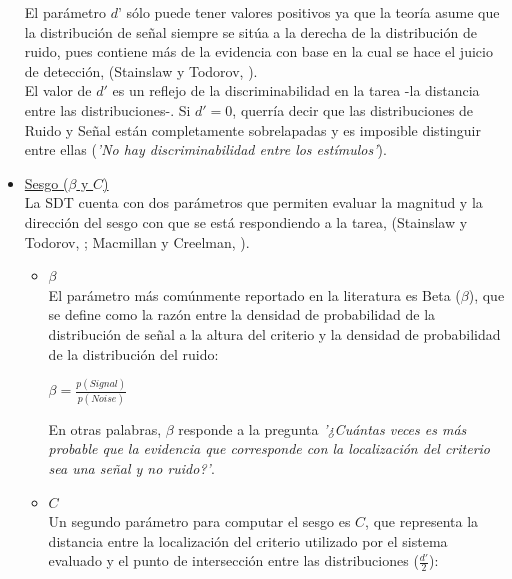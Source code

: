 \begin{itemize}
\begin{enumerate}
\end{enumerate}

El parámetro $d’$ sólo puede tener valores positivos ya que la teoría asume que la distribución de señal siempre se sitúa a la derecha de la distribución de ruido, pues contiene más de la evidencia con base en la cual se hace el juicio de detección, (Stainslaw y Todorov, \citeyear{Stainslaw1999}).\\

El valor de $d'$ es un reflejo de la discriminabilidad en la tarea -la distancia entre las distribuciones-. Si $d' = 0$, querría decir que las distribuciones de Ruido y Señal están completamente sobrelapadas y es imposible distinguir entre ellas (\textit{'No hay discriminabilidad entre los estímulos'}). \\

\item \underline{Sesgo ($\beta$ y $C$)}\\

La SDT cuenta con dos parámetros que permiten evaluar la magnitud y la dirección del sesgo con que se está respondiendo a la tarea, (Stainslaw y Todorov, \citeyear{Stainslaw1999}; Macmillan y Creelman, \citeyear{Macmillan1996}).\\

\begin{itemize}
\item \underline{$\beta$}\\

El parámetro más comúnmente reportado en la literatura es Beta ($\beta$), que se define como la razón entre la densidad de probabilidad de la distribución de señal a la altura del criterio y la densidad de probabilidad  de la distribución del ruido: \\

\begin{center}
$\beta = \frac{p(Signal)}{p(Noise)}$ \\
\end{center}

En otras palabras, $\beta$ responde a la pregunta \textit{'¿Cuántas veces es más probable que la evidencia que corresponde con la localización del criterio sea una señal y no ruido?'}.

\item \underline{$C$}\\

Un segundo parámetro para computar el sesgo es $C$, que representa la distancia entre la localización del criterio utilizado por el sistema evaluado y el punto de intersección entre las distribuciones ($\frac{d'}{2}$):\\


\end{itemize}
\end{itemize}
